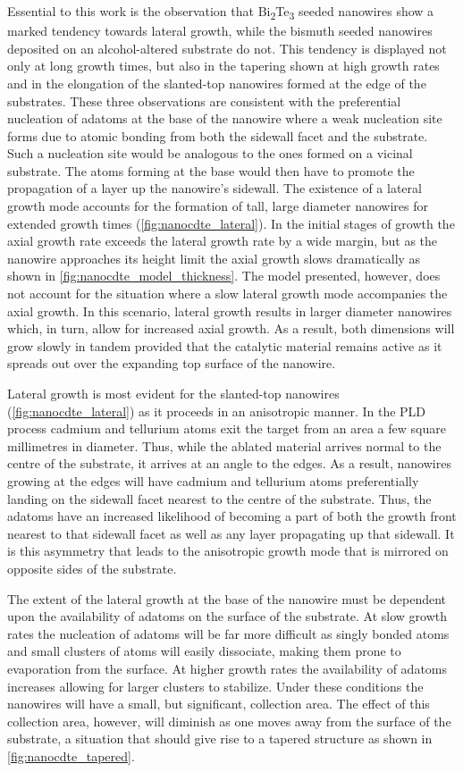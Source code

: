 Essential to this work is the observation that Bi\textsubscript{2}Te\textsubscript{3} seeded nanowires show a marked tendency towards lateral growth, while the bismuth seeded nanowires deposited on an alcohol-altered substrate do not.
This tendency is displayed not only at long growth times, but also in the tapering shown at high growth rates and in the elongation of the slanted-top nanowires formed at the edge of the substrates.
These three observations are consistent with the preferential nucleation of adatoms at the base of the nanowire where a weak nucleation site forms due to atomic bonding from both the sidewall facet and the substrate.
Such a nucleation site would be analogous to the ones formed on a vicinal substrate\cite{Ratsch2005a}.
The atoms forming at the base would then have to promote the propagation of a layer up the nanowire's sidewall.
The existence of a lateral growth mode accounts for the formation of tall, large diameter nanowires for extended growth times (\cref{fig:nanocdte_lateral}).
In the initial stages of growth the axial growth rate exceeds the lateral growth rate by a wide margin, but as the nanowire approaches its height limit the axial growth slows dramatically as shown in \cref{fig:nanocdte_model_thickness}.
The model presented, however, does not account for the situation where a slow lateral growth mode accompanies the axial growth.
In this scenario, lateral growth results in larger diameter nanowires which, in turn, allow for increased axial growth.
As a result, both dimensions will grow slowly in tandem provided that the catalytic material remains active as it spreads out over the expanding top surface of the nanowire.

Lateral growth is most evident for the slanted-top nanowires (\cref{fig:nanocdte_lateral}) as it proceeds in an anisotropic manner.
In the PLD process cadmium and tellurium atoms exit the target from an area a few square millimetres in diameter.
Thus, while the ablated material arrives normal to the centre of the substrate, it arrives at an angle to the edges.
As a result, nanowires growing at the edges will have cadmium and tellurium atoms preferentially landing on the sidewall facet nearest to the centre of the substrate.
Thus, the adatoms have an increased likelihood of becoming a part of both the growth front nearest to that sidewall facet as well as any layer propagating up that sidewall.
It is this asymmetry that leads to the anisotropic growth mode that is mirrored on opposite sides of the substrate.

The extent of the lateral growth at the base of the nanowire must be dependent upon the availability of adatoms on the surface of the substrate.
At slow growth rates the nucleation of adatoms will be far more difficult as singly bonded atoms and small clusters of atoms will easily dissociate, making them prone to evaporation from the surface.
At higher growth rates the availability of adatoms increases allowing for larger clusters to stabilize.
Under these conditions the nanowires will have a small, but significant, collection area.
The effect of this collection area, however, will diminish as one moves away from the surface of the substrate, a situation that should give rise to a tapered structure as shown in \cref{fig:nanocdte_tapered}.

